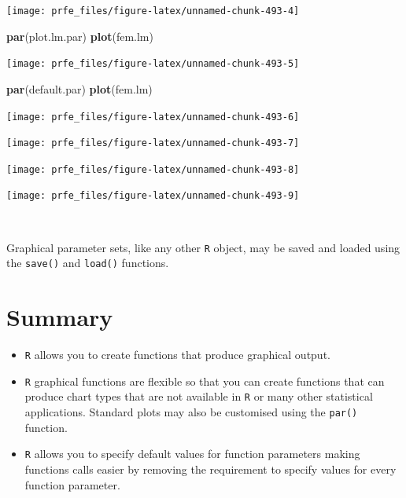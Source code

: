 \documentclass[12pt,a4paper]{book}
\newenvironment{Shaded}{\begin{snugshade}}{\end{snugshade}}
\newcommand{\KeywordTok}[1]{\textcolor[rgb]{0.13,0.29,0.53}{\textbf{#1}}}
\newcommand{\NormalTok}[1]{#1}
\theoremstyle{definition}
\theoremstyle{definition}
\theoremstyle{definition}
\theoremstyle{remark}
\begin{document}
\begin{center}\texttt{[image: prfe\_files/figure-latex/unnamed-chunk-493-4]} \end{center}

\begin{Shaded}
\begin{Highlighting}[]
\KeywordTok{par}\NormalTok{(plot.lm.par)}
\KeywordTok{plot}\NormalTok{(fem.lm)}
\end{Highlighting}
\end{Shaded}

\begin{center}\texttt{[image: prfe\_files/figure-latex/unnamed-chunk-493-5]} \end{center}

\begin{Shaded}
\begin{Highlighting}[]
\KeywordTok{par}\NormalTok{(default.par)}
\KeywordTok{plot}\NormalTok{(fem.lm)}
\end{Highlighting}
\end{Shaded}

\begin{center}\texttt{[image: prfe\_files/figure-latex/unnamed-chunk-493-6]} \end{center}

\begin{center}\texttt{[image: prfe\_files/figure-latex/unnamed-chunk-493-7]} \end{center}

\begin{center}\texttt{[image: prfe\_files/figure-latex/unnamed-chunk-493-8]} \end{center}

\begin{center}\texttt{[image: prfe\_files/figure-latex/unnamed-chunk-493-9]} \end{center}

~

Graphical parameter sets, like any other \texttt{R} object, may be saved
and loaded using the \texttt{save()} and \texttt{load()} functions.

\hypertarget{summary-7}{%
\section{Summary}\label{summary-7}}

\begin{itemize}
\item
  \texttt{R} allows you to create functions that produce graphical
  output.
\item
  \texttt{R} graphical functions are flexible so that you can create
  functions that can produce chart types that are not available in
  \texttt{R} or many other statistical applications. Standard plots may
  also be customised using the \texttt{par()} function.
\item
  \texttt{R} allows you to specify default values for function
  parameters making functions calls easier by removing the requirement
  to specify values for every function parameter.
\end{itemize}
\end{document}
